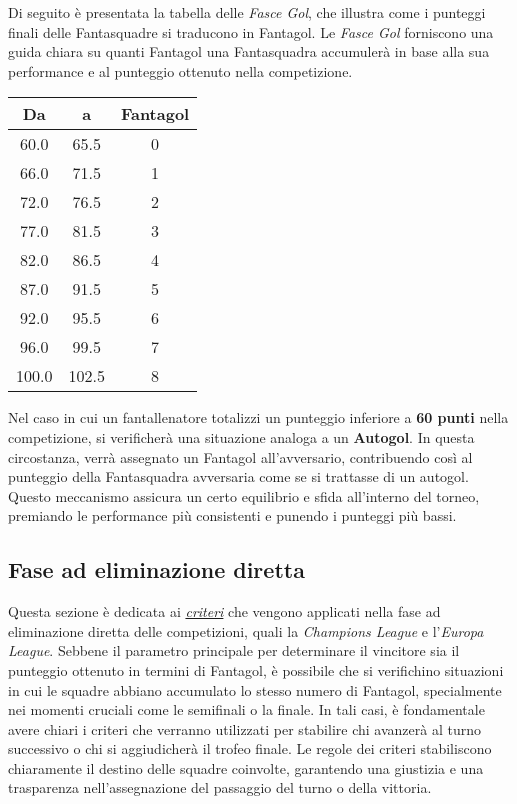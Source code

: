 \documentclass[12pt]{article}
\begin{document}
Di seguito è presentata la tabella delle \textit{Fasce Gol}, che illustra come i punteggi finali delle Fantasquadre si traducono in Fantagol. Le \textit{Fasce Gol} forniscono una guida chiara su quanti Fantagol una Fantasquadra accumulerà in base alla sua performance e al punteggio ottenuto nella competizione.
\newline
\\
\begin{tabular}{|c|c|c|}
    \hline
    \textbf{Da} & \textbf{a} & \textbf{Fantagol} \\
    \hline
    60.0 & 65.5 & 0 \\
    \hline
    66.0 & 71.5 & 1 \\
    \hline
    72.0 & 76.5 & 2 \\
    \hline
    77.0 & 81.5 & 3 \\
    \hline
    82.0 & 86.5 & 4 \\
    \hline
    87.0 & 91.5 & 5 \\
    \hline
    92.0 & 95.5 & 6 \\
    \hline
    96.0 & 99.5 & 7 \\
    \hline
    100.0 & 102.5 & 8 \\
    \hline
  \end{tabular}
\newline 

Nel caso in cui un fantallenatore totalizzi un punteggio inferiore a \textbf{60 punti} nella competizione, si verificherà una situazione analoga a un \textbf{Autogol}. In questa circostanza, verrà assegnato un Fantagol all'avversario, contribuendo così al punteggio della Fantasquadra avversaria come se si trattasse di un autogol. Questo meccanismo assicura un certo equilibrio e sfida all'interno del torneo, premiando le performance più consistenti e punendo i punteggi più bassi.

\subsection{Fase ad eliminazione diretta}

Questa sezione è dedicata ai \textit{\hyperref[supplementari-rigori]{criteri}} che vengono applicati nella fase ad eliminazione diretta delle competizioni, quali la \textit{Champions League} e l'\textit{Europa League}. Sebbene il parametro principale per determinare il vincitore sia il punteggio ottenuto in termini di Fantagol, è possibile che si verifichino situazioni in cui le squadre abbiano accumulato lo stesso numero di Fantagol, specialmente nei momenti cruciali come le semifinali o la finale. In tali casi, è fondamentale avere chiari i criteri che verranno utilizzati per stabilire chi avanzerà al turno successivo o chi si aggiudicherà il trofeo finale. Le regole dei criteri stabiliscono chiaramente il destino delle squadre coinvolte, garantendo una giustizia e una trasparenza nell'assegnazione del passaggio del turno o della vittoria.
\end{document}
